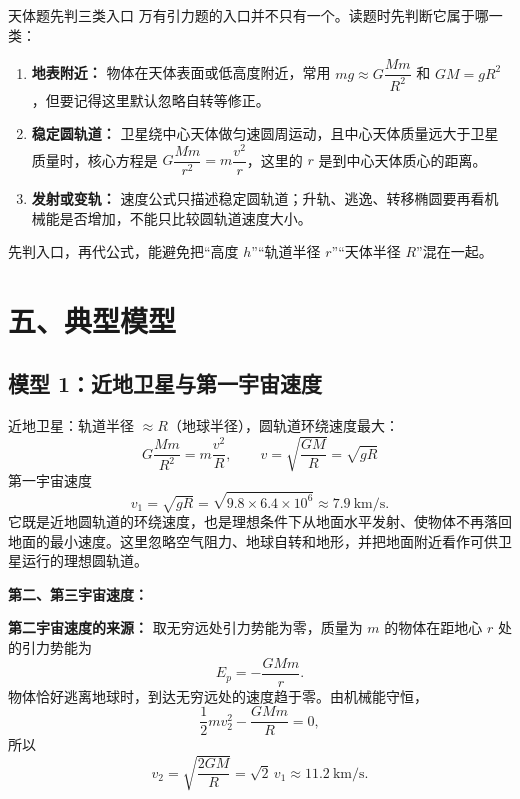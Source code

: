 \begin{learningbox}{天体题先判三类入口}
万有引力题的入口并不只有一个。读题时先判断它属于哪一类：
\begin{enumerate}
  \item \textbf{地表附近：} 物体在天体表面或低高度附近，常用 $mg\approx G\dfrac{Mm}{R^2}$ 和 $GM=gR^2$，但要记得这里默认忽略自转等修正。
  \item \textbf{稳定圆轨道：} 卫星绕中心天体做匀速圆周运动，且中心天体质量远大于卫星质量时，核心方程是 $G\dfrac{Mm}{r^2}=m\dfrac{v^2}{r}$，这里的 $r$ 是到中心天体质心的距离。
  \item \textbf{发射或变轨：} 速度公式只描述稳定圆轨道；升轨、逃逸、转移椭圆要再看机械能是否增加，不能只比较圆轨道速度大小。
\end{enumerate}
先判入口，再代公式，能避免把“高度 $h$”“轨道半径 $r$”“天体半径 $R$”混在一起。
\end{learningbox}

\section*{五、典型模型}

\subsection*{模型 1：近地卫星与第一宇宙速度}

近地卫星：轨道半径 $\approx R$（地球半径），圆轨道环绕速度最大：
\[
G\frac{Mm}{R^2} = m\frac{v^2}{R},\qquad v = \sqrt{\frac{GM}{R}} = \sqrt{gR}
\]
第一宇宙速度
\[
v_1 = \sqrt{gR} = \sqrt{9.8 \times 6.4 \times 10^6}
\approx 7.9\ \mathrm{km/s}.
\]
它既是近地圆轨道的环绕速度，也是理想条件下从地面水平发射、使物体不再落回地面的最小速度。这里忽略空气阻力、地球自转和地形，并把地面附近看作可供卫星运行的理想圆轨道。

\textbf{第二、第三宇宙速度：}

\begin{center}


\label{fig:cosmic-speeds}
\end{center}

\textbf{第二宇宙速度的来源：} 取无穷远处引力势能为零，质量为 $m$ 的物体在距地心 $r$ 处的引力势能为
\[
E_p=-\frac{GMm}{r}.
\]
物体恰好逃离地球时，到达无穷远处的速度趋于零。由机械能守恒，
\[
\frac12mv_2^2-\frac{GMm}{R}=0,
\]
所以
\[
\boxed{v_2=\sqrt{\frac{2GM}{R}}=\sqrt2\,v_1\approx11.2\ \mathrm{km/s}}.
\]

